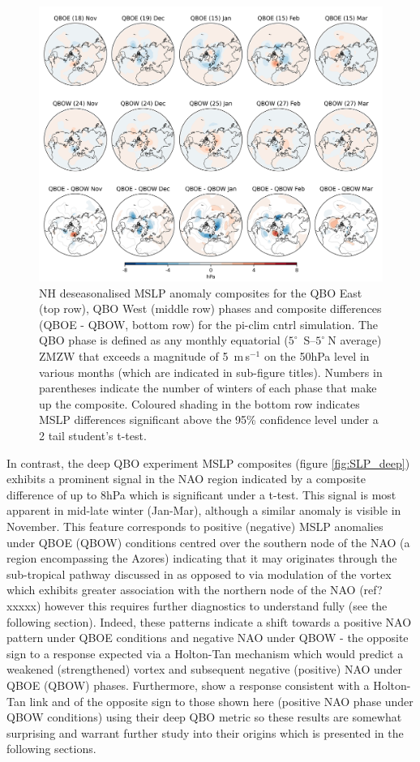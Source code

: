 \begin{figure}[h!]
\begin{center}
\noindent\includegraphics[width =0.8\linewidth]{Figures/Figures-deepQBO/SLP_composites_individual_months_QBO_phases_U_piclim_30hPa_5thresh.png}
\caption[]{NH deseasonalised MSLP anomaly composites for the QBO East (top row), QBO West (middle row) phases and composite differences (QBOE - QBOW, bottom row) for the pi-clim cntrl simulation. The QBO phase is defined as any monthly equatorial ($5^{\circ}$\ S--$5^{\circ}\ $N average) ZMZW that exceeds a magnitude of 5\ m\,s$^{-1}$ on the 50hPa level in various months (which are indicated in sub-figure titles). Numbers in parentheses indicate the number of winters of each phase that make up the composite. Coloured shading in the bottom row indicates MSLP differences significant above the 95\% confidence level under a 2 tail student’s t-test.}
\label{fig:SLP_piclim}
\end{center}
\end{figure}

In contrast, the deep QBO experiment MSLP composites (figure \ref{fig:SLP_deep}) exhibits a prominent signal in the NAO region indicated by a composite difference of up to 8hPa which is significant under a t-test. This signal is most apparent in mid-late winter (Jan-Mar), although a similar anomaly is visible in November. This feature corresponds to positive (negative) MSLP anomalies under QBOE (QBOW) conditions centred over the southern node of the NAO (a region encompassing the Azores) indicating that it may originates through the sub-tropical pathway discussed in \cite{graySurface2018b} as opposed to via modulation of the vortex which exhibits greater association with the northern node of the NAO (ref? xxxxx) however this requires further diagnostics to understand fully (see the following section). Indeed, these patterns indicate a shift towards a positive NAO pattern under QBOE conditions and negative NAO under QBOW - the opposite sign to a response expected via a Holton-Tan mechanism which would predict a weakened (strengthened) vortex and subsequent negative (positive) NAO under QBOE (QBOW) phases. Furthermore, \cite{andrewsObserved2019d} show a response consistent with a Holton-Tan link and of the opposite sign to those shown here (positive NAO phase under QBOW conditions) using their deep QBO metric so these results are somewhat surprising and warrant further study into their origins which is presented in the following sections.

